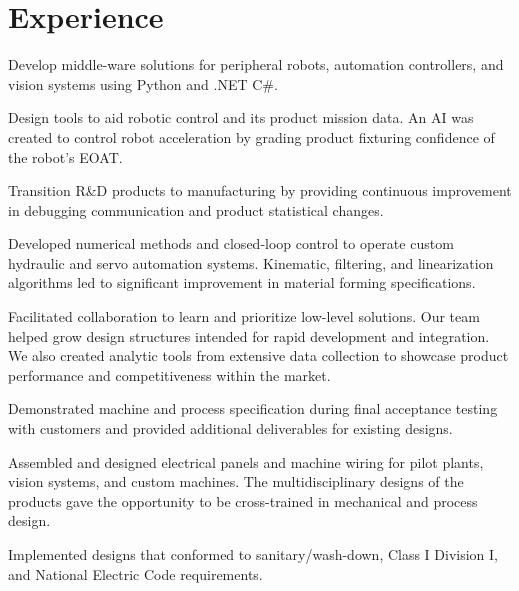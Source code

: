 \documentclass[]{TTurner}
\begin{document}
\begin{minipage}[t]{0.70\textwidth} 



\section{Experience}
\vspace{\topsep} %
\begin{tightemize}
\sectionsep
\item Develop middle-ware solutions for peripheral robots, automation controllers, and vision systems using Python and .NET C\#.
\item Design tools to aid robotic control and its product mission data. An AI was created to control robot acceleration by grading product fixturing confidence of the robot's EOAT.
\item Transition R\&D products to manufacturing by providing continuous improvement in debugging communication and product statistical changes.
\end{tightemize}
\sectionsep

\begin{tightemize}
\sectionsep
\item Developed numerical methods and closed-loop control to operate custom hydraulic and servo automation systems. Kinematic, filtering, and linearization algorithms led to significant improvement in material forming specifications.
\item Facilitated collaboration to learn and prioritize low-level solutions. Our team helped grow design structures intended for rapid development and integration. We also created analytic tools from extensive data collection to showcase product performance and competitiveness within the market.
\item Demonstrated machine and process specification during final acceptance testing with customers and provided additional deliverables for existing designs.  
\end{tightemize}
\sectionsep

\begin{tightemize}
\sectionsep
\item Assembled and designed electrical panels and machine wiring for pilot plants, vision systems, and custom machines. The multidisciplinary designs of the products gave the opportunity to be cross-trained in mechanical and process design. 
\item Implemented designs that conformed to sanitary/wash-down, Class I Division I, and National Electric Code requirements.              
\end{tightemize}
\sectionsep



\end{minipage}
\end{document}
